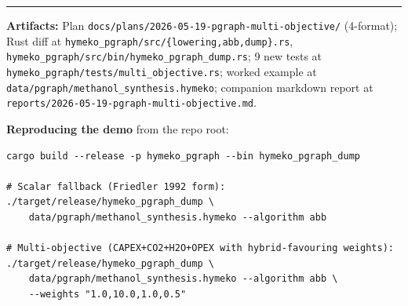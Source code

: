 \documentclass[11pt,a4paper]{article}
\newcommand{\code}[1]{\texttt{\small #1}}
\begin{document}
\vspace{8pt}\hrule\vspace{3pt}
\noindent\footnotesize
\textbf{Artifacts:} Plan
\code{docs/plans/2026-05-19-pgraph-multi-objective/} (4-format);
Rust diff at
\code{hymeko\_pgraph/src/\{lowering,abb,dump\}.rs},
\code{hymeko\_pgraph/src/bin/hymeko\_pgraph\_dump.rs};
9 new tests at
\code{hymeko\_pgraph/tests/multi\_objective.rs};
worked example at
\code{data/pgraph/methanol\_synthesis.hymeko};
companion markdown report at
\code{reports/2026-05-19-pgraph-multi-objective.md}.

\medskip
\noindent\textbf{Reproducing the demo} from the repo root:
\begin{lstlisting}[basicstyle=\ttfamily\scriptsize]
cargo build --release -p hymeko_pgraph --bin hymeko_pgraph_dump

# Scalar fallback (Friedler 1992 form):
./target/release/hymeko_pgraph_dump \
    data/pgraph/methanol_synthesis.hymeko --algorithm abb

# Multi-objective (CAPEX+CO2+H2O+OPEX with hybrid-favouring weights):
./target/release/hymeko_pgraph_dump \
    data/pgraph/methanol_synthesis.hymeko --algorithm abb \
    --weights "1.0,10.0,1.0,0.5"
\end{lstlisting}
\end{document}
